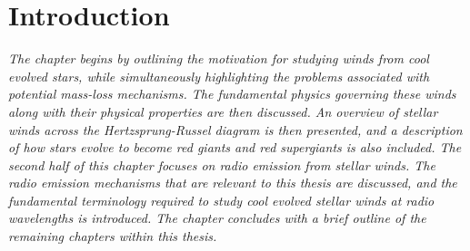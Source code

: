 \chapter{Introduction} \label{chap:1}
\vspace{-1cm}
\textit{The chapter begins by outlining the motivation for studying winds from cool evolved stars, while simultaneously highlighting the problems associated with potential mass-loss mechanisms. The fundamental physics governing these winds along with their physical properties are then discussed. An overview of stellar winds across the Hertzsprung-Russel diagram is then presented, and a description of how stars evolve to become red giants and red supergiants is also included. The second half of this chapter focuses on radio emission from stellar winds. The radio emission mechanisms that are relevant to this thesis are discussed, and the fundamental terminology required to study cool evolved stellar winds at radio wavelengths is introduced. The chapter concludes with a brief outline of the remaining chapters within this thesis.}

\pagebreak

